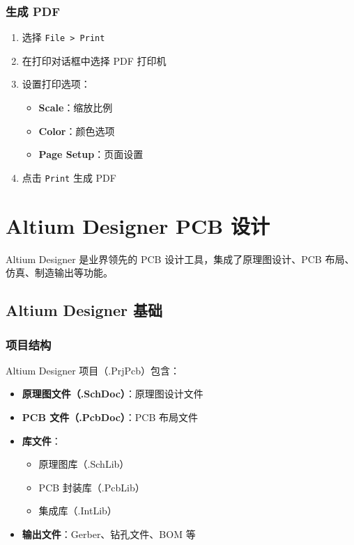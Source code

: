 \subsubsection{生成 PDF}


\begin{enumerate}
  \item 选择 \lstinline{File > Print}
  \item 在打印对话框中选择 PDF 打印机
  \item 设置打印选项：
    \begin{itemize}
      \item \textbf{Scale}：缩放比例
      \item \textbf{Color}：颜色选项
      \item \textbf{Page Setup}：页面设置
    \end{itemize}
  \item 点击 \lstinline{Print} 生成 PDF
\end{enumerate}

\section{Altium Designer PCB 设计}

Altium Designer 是业界领先的 PCB 设计工具，集成了原理图设计、PCB 布局、仿真、制造输出等功能。

\subsection{Altium Designer 基础}

\subsubsection{项目结构}

Altium Designer 项目（.PrjPcb）包含：

\begin{itemize}
  \item \textbf{原理图文件（.SchDoc）}：原理图设计文件
  \item \textbf{PCB 文件（.PcbDoc）}：PCB 布局文件
  \item \textbf{库文件}：
    \begin{itemize}
      \item 原理图库（.SchLib）
      \item PCB 封装库（.PcbLib）
      \item 集成库（.IntLib）
    \end{itemize}
  \item \textbf{输出文件}：Gerber、钻孔文件、BOM 等
\end{itemize}

